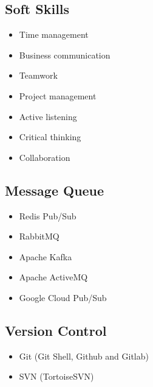 \begin{cventries}
\begin{row}[cellsep=0.75cm]{3}{3}
\begin{cell}{1}
	\section*{Soft Skills}
	\vspace{-1.5ex}
    \begin{itemize}
        \item {Time management}
        \item {Business communication}
        \item {Teamwork}
        \item {Project management}
        \item {Active listening}
        \item {Critical thinking}
        \item {Collaboration}
    \end{itemize}
	\end{cell}
\end{row}

\begin{row}[cellsep=0.75cm]{3}{3}
    \begin{cell}{1}
	\section*{Message Queue}
	\vspace{-1.5ex}
    \begin{itemize}
        \item {Redis Pub/Sub}
        \item {RabbitMQ}
        \item {Apache Kafka}
        \item {Apache ActiveMQ}
        \item {Google Cloud Pub/Sub}
    \end{itemize}
	\end{cell}
    \begin{cell}{1}
	\section*{Version Control}
	\vspace{-1.5ex}
    \begin{itemize}
        \item {Git (Git Shell, Github and Gitlab)}
        \item {SVN (TortoiseSVN)}
    \end{itemize}
	\end{cell}
	\begin{cell}{1}

\end{cell}
\end{row}
\end{cventries}
